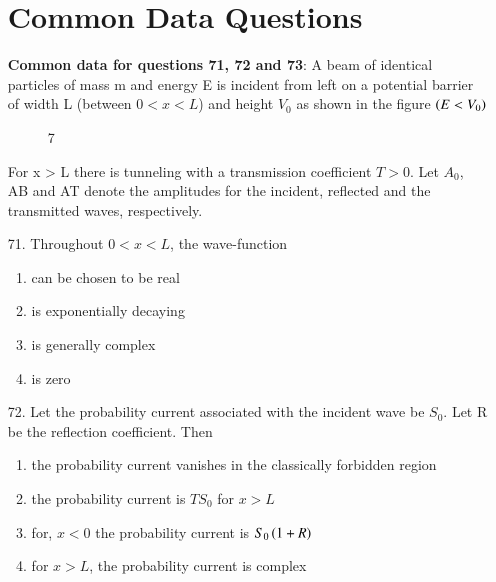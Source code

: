 \documentclass[journal]{IEEEtran}
\begin{document}
\begin{enumerate}
      \begin{figure}[!ht]
        \centering
    \end{figure}
    \begin{figure}[!ht]
      \centering
       \end{figure}
      
   
    \section{Common Data Questions}
    \textbf{Common data for questions 71, 72 and 73}: A beam of identical particles of mass m and energy E is incident from left on a potential barrier of width L (between $0 < x < L$) and height $V_0$ as shown in the figure $\left(E < V_0\right)$
    \begin{figure}[!ht]
      \centering
      \caption{ 7}
      \label{fig 7}
  \end{figure}
    For x > L there is tunneling with a transmission coefficient $T > 0$. Let $A_0$, AB and AT denote the amplitudes for the incident, reflected and the transmitted waves, respectively.
    \item[71.] Throughout $0 < x < L$, the wave-function
      \begin{enumerate}[label=(\Alph*)]
        \item can be chosen to be real
        \item is exponentially decaying
        \item is generally complex
        \item  is zero
      \end{enumerate}
    \item[72.]  Let the probability current associated with the incident wave be $S_0$. Let R be the reflection coefficient. Then
      \begin{enumerate}[label=(\Alph*)]
        \item the probability current vanishes in the classically forbidden region
        \item the probability current is $TS_0$ for $x > L$
        \item for, $x < 0$ the probability current is $S_0\left(1 + R\right)$
        \item  for $x > L$, the probability current is complex

\end{enumerate}
\end{enumerate}
\end{document}
